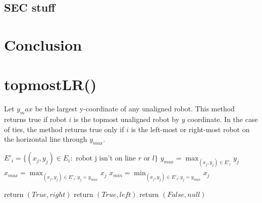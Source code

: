 \documentclass[preprint,10pt]{elsarticle}
\begin{document}
	

		


	



%

\subsection{SEC stuff } 

\section{Conclusion}
\label{}


\appendix
\section{topmostLR()} 

Let $y_max$ be the largest y-coordinate of any unaligned robot. 
This method returns true if robot $i$ is the topmost unaligned robot by $y$ coordinate. In the
case of ties, the method returns true only if $i$ is the left-most or right-most 
robot on the horizontal line through $y_{max}$.

\begin{algorithm}
\begin{algorithmic}
	\State $E'_i = \{ (x_j, y_j) \in E_i : \text{ robot j isn't on line } r \text{ or } l\}$
	\State $y_{max} = \max_{(x_j, y_j) \in E'_i}{y_j}$ 
	\State $x_{max} = \max_{(x_j, y_j) \in E'_i : y_j = y_{max} }{x_j}$ 
	\State $x_{min} = \min_{(x_j, y_j) \in E'_i : y_j = y_{max} }{x_j}$ 

		\State return $(True, right)$
		\State return $(True, left)$
	\Else
		\State return $(False, null)$
	\EndIf

\EndProcedure
\end{algorithmic}
\end{algorithm}
\end{document}
